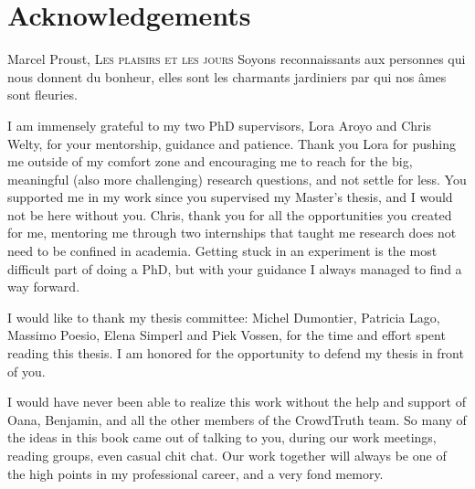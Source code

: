 


\manualmark
{}

\chapter*{Acknowledgements}

\begin{chapquote}{Marcel Proust, \textsc{Les plaisirs et les jours}}
Soyons reconnaissants aux personnes qui nous donnent du bonheur, elles sont les charmants jardiniers par qui nos âmes sont fleuries.
\end{chapquote}

I am immensely grateful to my two PhD supervisors, Lora Aroyo and Chris Welty, for your mentorship, guidance and patience. Thank you Lora for pushing me outside of my comfort zone and encouraging me to reach for the big, meaningful (also more challenging) research questions, and not settle for less. You supported me in my work since you supervised my Master's thesis, and I would not be here without you. Chris, thank you for all the opportunities you created for me, mentoring me through two internships that taught me research does not need to be confined in academia. Getting stuck in an experiment is the most difficult part of doing a PhD, but with your guidance I always managed to find a way forward.

I would like to thank my thesis committee: Michel Dumontier, Patricia Lago, Massimo Poesio, Elena Simperl and Piek Vossen, for the time and effort spent reading this thesis. I am honored for the opportunity to defend my thesis in front of you.

I would have never been able to realize this work without the help and support of Oana, Benjamin, and all the other members of the CrowdTruth team. So many of the ideas in this book came out of talking to you, during our work meetings, reading groups, even casual chit chat. Our work together will always be one of the high points in my professional career, and a very fond memory.

